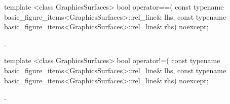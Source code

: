 %
\begin{itemdecl}
template <class GraphicsSurfaces>
bool operator==(
  const typename basic_figure_items<GraphicsSurfaces>::rel_line& lhs,
  const typename basic_figure_items<GraphicsSurfaces>::rel_line& rhs)
  noexcept;
\end{itemdecl}
\begin{itemdescr}
\pnum
\returns
{}.
\end{itemdescr}

%
\begin{itemdecl}
template <class GraphicsSurfaces>
bool operator!=(
  const typename basic_figure_items<GraphicsSurfaces>::rel_line& lhs,
  const typename basic_figure_items<GraphicsSurfaces>::rel_line& rhs)
  noexcept;
\end{itemdecl}
\begin{itemdescr}
\pnum
\returns {}.
\end{itemdescr}
